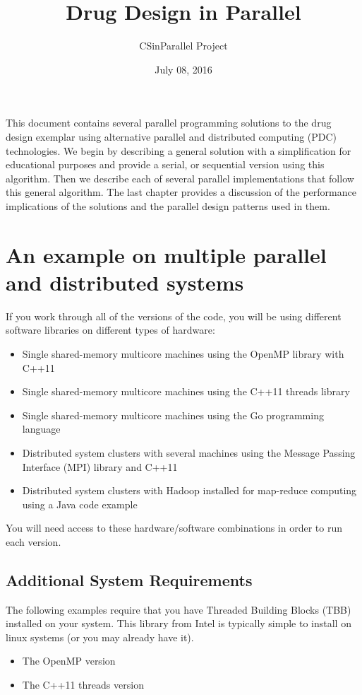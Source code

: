 \documentclass[letterpaper,10pt,openany,oneside]{sphinxmanual}
\title{Drug Design in Parallel}
\date{July 08, 2016}
\author{CSinParallel Project}
\begin{document}
\maketitle
\tableofcontents
{}\label{index::doc}


This document contains several parallel programming solutions to the drug design exemplar using alternative parallel and distributed computing (PDC) technologies. We begin by describing a general solution with a simplification for educational purposes and provide a serial, or sequential version using this algorithm. Then we describe each of several parallel implementations that follow this general algorithm. The last chapter provides a discussion of the performance implications of the solutions and the parallel design patterns used in them.


\chapter{An example on multiple parallel and distributed systems}
\label{index:drug-design-in-parallel}\label{index:an-example-on-multiple-parallel-and-distributed-systems}
If you work through all of the versions of the code, you will be using different software libraries on different types of hardware:
\begin{itemize}
\item {} 
Single shared-memory multicore machines using the OpenMP library with C++11

\item {} 
Single shared-memory multicore machines using the C++11 threads library

\item {} 
Single shared-memory multicore machines using the Go programming language

\item {} 
Distributed system clusters with several machines using the Message Passing Interface (MPI) library and C++11

\item {} 
Distributed system clusters with Hadoop installed for map-reduce computing using a Java code example

\end{itemize}

You will need access to these hardware/software combinations in order to run each version.


\section{Additional System Requirements}
\label{index:additional-system-requirements}
The following examples require that you have Threaded Building Blocks (TBB) installed on your system. This library from Intel is typically simple to install on linux systems (or you may already have it).
\begin{itemize}
\item {} 
The OpenMP version

\item {} 
The C++11 threads version

\end{itemize}
\end{document}
